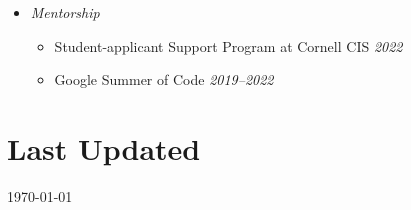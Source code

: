 \documentclass[margin]{res}
\begin{document}
\begin{resume}
\begin{itemize}[nosep]
	\item \emph{Mentorship}
	\begin{itemize}[nosep]
		\item Student-applicant Support Program at Cornell CIS \hfill \emph{2022}
		\item Google Summer of Code \hfill \emph{2019--2022}
	\end{itemize}
	
	
\end{itemize}

\section{Last Updated} \today


\end{resume}
\end{document}
